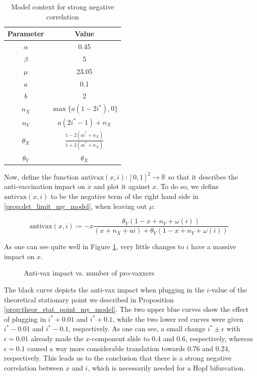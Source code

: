 \documentclass[12pt,a4paper,twoside]{article}
\begin{document}
\begin{table}[h!]
	\centering
	\begin{tabular}{c|c}
		Parameter & Value \\
		\hline
		$\alpha$&0.45\\
		$\beta$&5\\
		$\mu$&23.05\\
		$a$&0.1\\
		$b$&2\\
		$n_X$&$\max \lbrace a\left(1-2i^*\right), 0\rbrace$\\
		$n_Y$&$a\left(2i^* - 1\right) + n_X$\\
		$\theta_X$&$\frac{1-2\left(ai^* + n_X\right)}{1+2\left(ai^* + n_X\right)}$\\
		$\theta_Y$& $\theta_X$\\
	\end{tabular}
	\caption{Model context for strong negative correlation}
	\label{table:alu_vs_x_params}
\end{table}

Now, define the function $\mathrm{antivax}\left(x,i\right): \left[0,1\right]^2 \rightarrow \mathbb{R}$ so that it describes the anti-vaccination impact on $\dot{x}$ and plot it against $x$. To do so, we define $\mathrm{antivax}\left(x,i\right)$ to be the negative term of the right hand side in \eqref{prop:det_limit_my_model}, when leaving out $\mu$:

\begin{equation*}
\mathrm{antivax}\left(x,i\right) \coloneqq -x\frac{\theta_Y(1-x+n_Y+\omega\left(i\right))}{(x+n_X+ai) + \theta_Y(1-x+n_Y+\omega\left(i\right))}
\end{equation*}

 As one can see quite well in Figure \ref{fig:alu_vs_x}, very little changes to $i$ have a massive impact on $x$.

\begin{figure}[h!]
	\centering
	\caption{Anti-vax impact vs. number of pro-vaxxers}
	\label{fig:alu_vs_x}
	\def\svgwidth{350pt}
	
\end{figure}

The black curve depicts the anti-vax impact when plugging in the $i$-value of the theoretical stationary point we described in Proposition \ref{prop:theor_stat_point_my_model}. The two upper blue curves show the effect of plugging in $i^* + 0.01$ and $i^* + 0.1$, while the two lower red curves were given $i^* - 0.01$ and $i^* - 0.1$, respectively. As one can see, a small change $i^* \pm \epsilon$ with $\epsilon = 0.01$ already made the $x$-component slide to 0.4 and 0.6, respectively, whereas $\epsilon = 0.1$ caused a way more considerable translation towards
0.76 and 0.24, respectively. This leads us to the conclusion that there is a strong negative correlation between $x$ and $i$, which is necessarily needed for a Hopf bifurcation.
\end{document}
